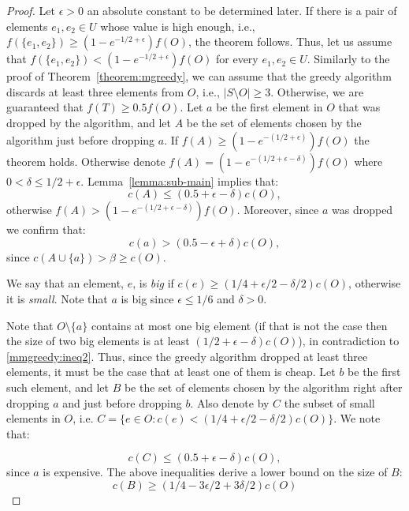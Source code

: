 \def\eps{0.104}
\begin{proof}
Let $\epsilon > 0$ an absolute constant to be determined later.
If there is a pair of elements $e_1, e_2 \in U$ whose value is high enough, i.e., $f(\{e_1, e_2\}) \geq (1 - e^{-1/2 + \epsilon})f(O)$, the theorem follows.
Thus, let us assume that $f(\{e_1, e_2\}) < (1 - e^{-1/2 + \epsilon})f(O)$ for every $e_1, e_2 \in U$.
Similarly to the proof of Theorem~\ref{theorem:mgreedy}, we can assume that the greedy algorithm discards at least three elements from $O$, i.e., $|S \setminus O| \geq 3$.
Otherwise, we are guaranteed that $f(T) \geq 0.5f(O)$.
% 
Let $a$ be the first element in $O$ that was dropped by the algorithm, 
and let $A$ be the set of elements chosen by the algorithm just before dropping $a$.
% 
If $f(A) \geq (1 - e^{-(1/2 + \epsilon)})f(O)$ the theorem holds.
Otherwise denote $f(A) = (1 - e^{-(1/2 + \epsilon - \delta)})f(O)$ where $0 < \delta \leq 1/2 + \epsilon$.
% 
Lemma~\ref{lemma:sub-main} implies that: 
\begin{equation}
	\label{mmgreedy:ineq1}
	c(A) \leq (0.5 + \epsilon - \delta)c(O),
\end{equation}
otherwise $f(A) > (1-e^{-(1/2 + \epsilon - \delta)})f(O)$.
Moreover, since $a$ was dropped we confirm that:
\begin{equation}
	\label{mmgreedy:ineq2}
	c(a) > (0.5 -\epsilon + \delta)c(O),
\end{equation}
since $c(A \cup \{a\}) > \beta \geq c(O)$.

We say that an element, $e$, is \emph{big} if $c(e) \geq (1/4 + \epsilon/2 - \delta/2)c(O)$, 
otherwise it is \emph{small}.
Note that $a$ is big since $\epsilon \leq 1/6$ and $\delta > 0$.

Note that $O\setminus\{a\}$ contains at most one big element (if that is not the case then the size of two big elements is at least $(1/2 + \epsilon - \delta)c(O)$), in contradiction to \ref{mmgreedy:ineq2}.
Thus, since the greedy algorithm dropped at least three elements, it must be the case that at least one of them is cheap.
Let $b$ be the first such element, and let $B$ be the set of elements chosen by the 
algorithm right after dropping $a$ and just before dropping $b$.
Also denote by $C$ the subset of small elements in $O$, 
i.e. $C = \{e \in O : c(e) < (1/4 + \epsilon/2 - \delta/2)c(O)\}$.
We note that:

\begin{equation}
\label{mmgreedy:ineq3}
c(C) \leq (0.5 + \epsilon - \delta)c(O),
\end{equation}
since $a$ is expensive.
% 
The above inequalities derive a lower bound on the size of $B$:
\begin{equation}
	\label{mmgreedy:lower-bound-cB}
	c(B) \geq (1/4 - 3\epsilon/2 + 3\delta/2)c(O)
\end{equation}


\end{proof}
